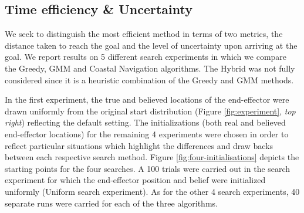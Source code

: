 \subsection{Time efficiency \& Uncertainty}

We seek to distinguish the most efficient method in terms of two metrics, the distance taken to reach the goal
and the level of uncertainty upon arriving at the goal. We report results on 5 different search 
experiments in which we compare the Greedy, GMM and Coastal Navigation algorithms. The Hybrid was not fully considered since it 
is a heuristic combination of the Greedy and GMM methods. 


In the first experiment, the true and believed locations of the end-effector 
were drawn uniformly from the original start distribution (Figure \ref{fig:experiment}, \textit{top right}) 
reflecting the default setting. The initializations (both real and believed end-effector locations) for the remaining 4 experiments
were chosen in order to reflect particular situations which highlight the differences and draw backs between each respective search 
method. Figure \ref{fig:four-initialisations} depicts the starting points for the four searches. 
A 100 trials were carried out in the search experiment for which the end-effector position and belief were initialized uniformly 
(Uniform search experiment). As for the other 4 search experiments, 40 separate runs were carried for each of the three algorithms.


